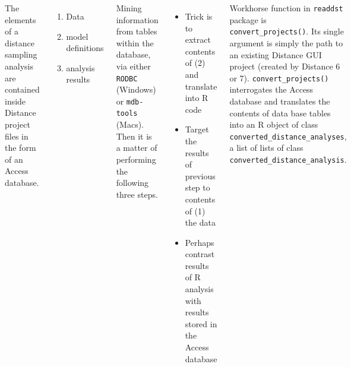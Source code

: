 \documentclass[14pt,a1paper,landscape]{tikzposter}
\begin{document}
\begin{columns}
{\begin{figure}
	\begin{tikzfigure}
		\includegraphics[width=.85\linewidth]{dst-file-structure.PNG}
	\end{tikzfigure}
\end{figure}

The elements of a distance sampling analysis are contained inside Distance project files in the form of an Access database.

\begin{enumerate}
	\item Data
	\item model definitions
	\item analysis results
\end{enumerate}

Mining information from tables within the database, via either \texttt{RODBC} (Windows) or \texttt{mdb-tools} (Macs).  Then it is a matter of performing the following three steps.

\begin{itemize}
	\item Trick is to extract contents of (2) and translate into R code
	\item Target the results of previous step to contents of (1) the data
	\item Perhaps contrast results of R analysis with results stored in the Access database
\end{itemize}

}

{
	Workhorse function in \texttt{readdst} package is \texttt{convert\_projects()}.  Its single argument is simply the path to an existing Distance GUI project (created by Distance 6 or 7).  \texttt{convert\_projects()} interrogates the Access database and translates the contents of data base tables into an R object of class \texttt{converted\_distance\_analyses}, a list of lists of class \texttt{converted\_distance\_analysis}.
}


\end{columns}
\end{document}
